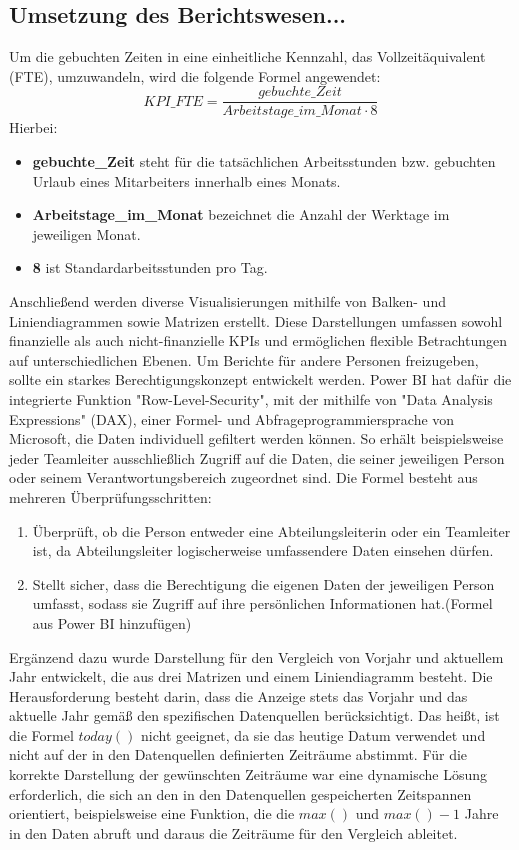 \documentclass[a4paper, 12pt]{scrartcl}
\begin{document}
	\subsection{Umsetzung des Berichtswesen...}
Um die gebuchten Zeiten in eine einheitliche Kennzahl, das Vollzeitäquivalent (FTE), umzuwandeln, wird die folgende Formel angewendet:
\[ KPI\_FTE = \frac{gebuchte\_Zeit}{Arbeitstage\_im\_Monat \cdot 8} \] Hierbei:
\begin{itemize}
	\item \textbf{gebuchte\_Zeit} steht für die tatsächlichen Arbeitsstunden bzw. gebuchten Urlaub eines Mitarbeiters innerhalb eines Monats.
	\item \textbf{Arbeitstage\_im\_Monat} bezeichnet die Anzahl der Werktage im jeweiligen Monat.
	\item \textbf{8} ist Standardarbeitsstunden pro Tag.
\end{itemize}
Anschließend werden diverse Visualisierungen mithilfe von Balken- und Liniendiagrammen sowie Matrizen erstellt. Diese Darstellungen umfassen sowohl finanzielle als auch nicht-finanzielle KPIs und ermöglichen flexible Betrachtungen auf unterschiedlichen Ebenen.\newline
Um Berichte für andere Personen freizugeben, sollte ein starkes Berechtigungskonzept entwickelt werden. Power BI hat dafür die integrierte Funktion "Row-Level-Security", mit der mithilfe von "Data Analysis Expressions" (DAX)\cite{DAX}, einer Formel- und Abfrageprogrammiersprache von Microsoft, die Daten individuell gefiltert werden können. So erhält beispielsweise jeder Teamleiter ausschließlich Zugriff auf die Daten, die seiner jeweiligen Person oder seinem Verantwortungsbereich zugeordnet sind. Die Formel besteht aus mehreren Überprüfungsschritten:
\begin{enumerate}
	\item Überprüft, ob die Person entweder eine Abteilungsleiterin oder ein Teamleiter ist, da Abteilungsleiter logischerweise umfassendere Daten einsehen dürfen. 
	\item Stellt sicher, dass die Berechtigung die eigenen Daten der jeweiligen Person umfasst, sodass sie Zugriff auf ihre persönlichen Informationen hat.(Formel aus Power BI hinzufügen)
\end{enumerate}
Ergänzend dazu wurde Darstellung für den Vergleich von Vorjahr und aktuellem Jahr entwickelt, die aus drei Matrizen und einem Liniendiagramm besteht. Die Herausforderung besteht darin, dass die Anzeige stets das Vorjahr und das aktuelle Jahr gemäß den spezifischen Datenquellen berücksichtigt. Das heißt, ist die Formel  $today()$ nicht geeignet, da sie das heutige Datum verwendet und nicht auf der in den Datenquellen definierten Zeiträume abstimmt. Für die korrekte Darstellung der gewünschten Zeiträume war eine dynamische Lösung erforderlich, die sich an den in den Datenquellen gespeicherten Zeitspannen orientiert, beispielsweise eine Funktion, die die $max()$ und $max()-1$ Jahre in den Daten abruft und daraus die Zeiträume für den Vergleich ableitet.\newline
\end{document}
